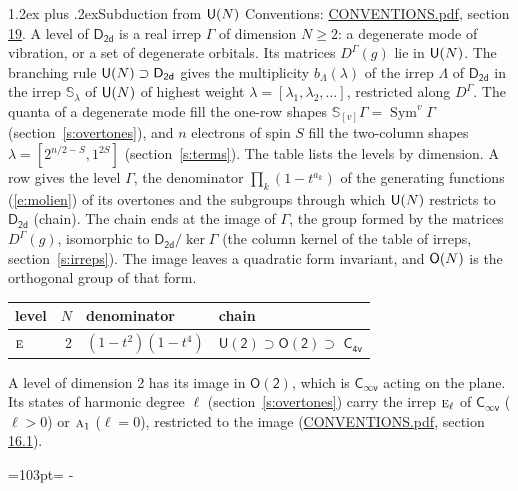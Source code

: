 \documentclass[10pt,a4paper]{article}
\makeatletter
\renewcommand\section{\@startsection{section}{1}{\z@}{-3ex plus -1ex minus -.2ex}%
  {1.2ex plus .2ex}{\normalfont\large\sffamily\bfseries\color{parttitle}}}
\newcommand{\needspace}[1]{\par\penalty-100\begingroup\dimen0=#1\relax\dimen2=\pagegoal
  \advance\dimen2-\pagetotal\ifdim\dimen0>\dimen2\relax\ifdim\dimen2>0pt\vfil\break\fi\fi
  \endgroup}
\numberwithin{equation}{section}
\newcommand{\grp}[1]{\mathsf{#1}}
\newcommand{\irr}[1]{\text{\normalfont\scshape #1}}
\newcommand{\repD}[1]{D^{#1}}
\newcommand{\schur}[1]{\mathbb{S}_{#1}}
\newcommand{\shape}[1]{[#1]}
\makeatother
\begin{document}
\section{Subduction from \texorpdfstring{$\grp{U(\mathnormal{N})}$}{U(N)}}\label{s:unitary}
Conventions: \href{../../CONVENTIONS.pdf}{CONVENTIONS.pdf}, section \href{../../CONVENTIONS.pdf\#conv.19}{19}.
\leavevmode\label{n:local.level.dimension}A level of $\grp{D_{2d}}$ is a real irrep $\Gamma$ of dimension $N \ge 2$: a degenerate mode of vibration, or a set of degenerate orbitals. \label{n:group.unitary}Its matrices $\repD{\Gamma}(g)$ lie in $\grp{U(\mathnormal{N})}$. \label{n:irrep.schur}\label{n:shape.partition}\label{n:local.partition}\label{n:function.multiplicity.unitary}The branching rule $\grp{U(\mathnormal{N})} \supset \grp{D_{2d}}$ gives the multiplicity $b_\Lambda(\lambda)$ of the irrep $\Lambda$ of $\grp{D_{2d}}$ in the irrep $\schur{\lambda}$ of $\grp{U(\mathnormal{N})}$ of highest weight $\lambda = \shape{\lambda_1, \lambda_2, \dots}$, restricted along $\repD{\Gamma}$. \label{n:local.partition.power}\label{n:local.electrons}\label{n:local.spin}The quanta of a degenerate mode fill the one-row shapes $\schur{\shape{v}}\Gamma = \operatorname{Sym}^{v}\Gamma$ (section~\ref{s:overtones}), and $n$ electrons of spin $S$ fill the two-column shapes $\lambda = \shape{2^{n/2-S}, 1^{2S}}$ (section~\ref{s:terms}).
The table lists the levels by dimension. \label{n:head.level}\label{n:head.denominator}\label{n:index.overtone.denominator}\label{n:head.chain}A row gives the level $\Gamma$, the denominator $\prod_k (1 - t^{a_k})$ of the generating functions (\ref{e:molien}) of its overtones and the subgroups through which $\grp{U(\mathnormal{N})}$ restricts to $\grp{D_{2d}}$ (chain). The chain ends at the image of $\Gamma$, the group formed by the matrices $\repD{\Gamma}(g)$, isomorphic to $\grp{D_{2d}}/\ker\Gamma$ (the column kernel of the table of irreps, section~\ref{s:irreps}). The image leaves a quadratic form invariant, and $\grp{O(\mathnormal{N})}$ is the orthogonal group of that form.
{\small\begin{longtable}{@{}lrll@{}}\toprule
level & $N$ & denominator & chain\\\midrule\endhead
\bottomrule\endfoot\endlastfoot
$\irr{e}$ & 2 & $(1-t^{2})(1-t^{4})$ & $\grp{U(2)} \supset \grp{O(2)} \supset$ \href{C4v.pdf}{$\grp{C_{4v}}$}\\
\bottomrule\end{longtable}}
A level of dimension 2 has its image in $\grp{O(2)}$, which is \href{Cinfv.pdf}{$\grp{C_{\infty v}}$} acting on the plane. \label{n:index.harmonic.degree}Its states of harmonic degree $\ell$ (section~\ref{s:overtones}) carry the irrep $\irr{e}_{\ell}$ of \href{Cinfv.pdf}{$\grp{C_{\infty v}}$} ($\ell > 0$) or $\irr{a}_{1}$ ($\ell = 0$), restricted to the image (\href{../../CONVENTIONS.pdf}{CONVENTIONS.pdf}, section \href{../../CONVENTIONS.pdf\#conv.16.1}{16.1}).
\needspace{103pt}
\end{document}

